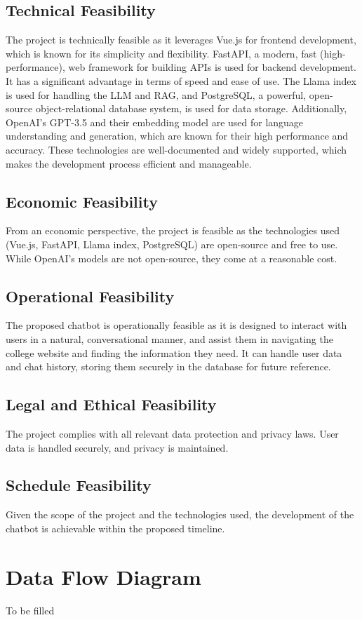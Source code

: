 \subsection{Technical Feasibility}
The project is technically feasible as it leverages Vue.js for frontend development, which is known for its simplicity and flexibility. FastAPI, a modern, fast (high-performance), web framework for building APIs is used for backend development. It has a significant advantage in terms of speed and ease of use. The Llama index is used for handling the LLM and RAG, and PostgreSQL, a powerful, open-source object-relational database system, is used for data storage. Additionally, OpenAI's GPT-3.5 and their embedding model are used for language understanding and generation, which are known for their high performance and accuracy. These technologies are well-documented and widely supported, which makes the development process efficient and manageable.
\subsection{Economic Feasibility}
From an economic perspective, the project is feasible as the technologies used (Vue.js, FastAPI, Llama index, PostgreSQL) are open-source and free to use. While OpenAI's models are not open-source, they come at a reasonable cost.
\subsection{Operational Feasibility}
The proposed chatbot is operationally feasible as it is designed to interact with users in a natural, conversational manner, and assist them in navigating the college website and finding the information they need. It can handle user data and chat history, storing them securely in the database for future reference.
\subsection{Legal and Ethical Feasibility}
The project complies with all relevant data protection and privacy laws. User data is handled securely, and privacy is maintained.
\subsection{Schedule Feasibility}
Given the scope of the project and the technologies used, the development of the chatbot is achievable within the proposed timeline.
\section{Data Flow Diagram}
To be filled 
